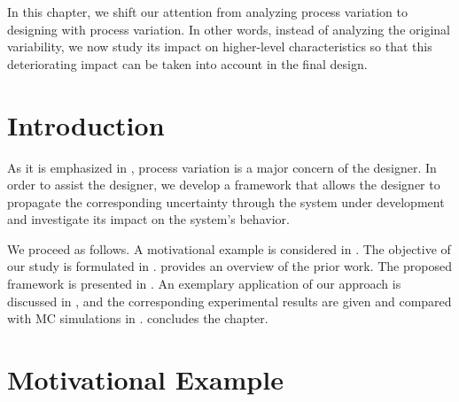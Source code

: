 In this chapter, we shift our attention from analyzing process variation to
designing with process variation. In other words, instead of analyzing the
original variability, we now study its impact on higher-level characteristics so
that this deteriorating impact can be taken into account in the final design.

\section{Introduction}

As it is emphasized in , process variation is a
major concern of the designer. In order to assist the designer, we develop a
framework that allows the designer to propagate the corresponding uncertainty
through the system under development and investigate its impact on the system's
behavior.

We proceed as follows. A motivational example is considered in
. The objective of our study is formulated in
.  provides an overview of the prior work.
The proposed framework is presented in . An exemplary
application of our approach is discussed in , and the
corresponding experimental results are given and compared with \ac{MC}
simulations in .  concludes the
chapter.

\section{Motivational Example}

